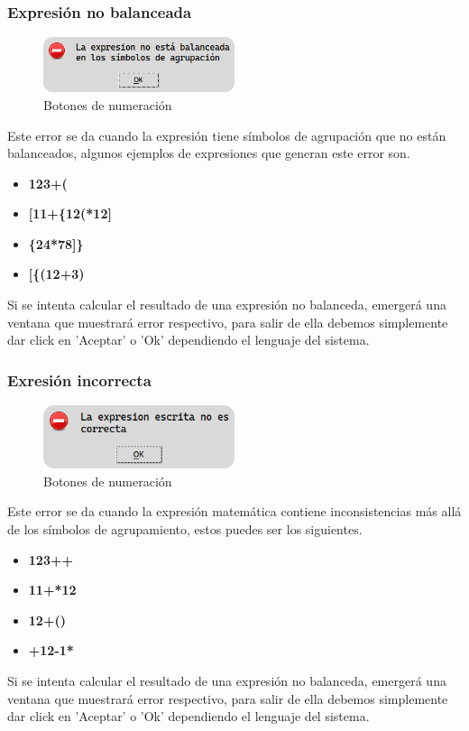 \documentclass[a4paper,12pt]{article}
\begin{document}
\subsubsection{Expresión no balanceada}
\begin{figure}[h!]
    \centering
    \includegraphics[width=0.5\textwidth]{../img/error2.png}
    \caption{Botones de numeración}
    \label{fig: no balanceada}
\end{figure}
Este error se da cuando la expresión tiene símbolos de agrupación que no están balanceados, algunos ejemplos de expresiones que generan este error son.
\begin{itemize}
    \item \textbf{123+(} 
    \item \textbf{ [11+\{12(*12] }
    \item \textbf{\{24*78]\}}
    \item \textbf{ [\{(12+3) }
\end{itemize}
Si se intenta calcular el resultado de una expresión no balanceda, emergerá una ventana que muestrará error respectivo, para salir de ella debemos simplemente dar click en 'Aceptar' o 'Ok' dependiendo el lenguaje del sistema.

\subsubsection{Exresión incorrecta}
\begin{figure}[h!]
    \centering
    \includegraphics[width=0.5\textwidth]{../img/error1.png}
    \caption{Botones de numeración}
    \label{fig: inconsistente}
\end{figure}
Este error se da cuando la expresión matemática contiene inconsistencias más allá de los símbolos de agrupamiento, estos puedes ser los siguientes.
\begin{itemize}
    \item \textbf{123++} 
    \item \textbf{ 11+*12 }
    \item \textbf{12+()}
    \item \textbf{ +12-1* }
\end{itemize}
Si se intenta calcular el resultado de una expresión no balanceda, emergerá una ventana que muestrará error respectivo, para salir de ella debemos simplemente dar click en 'Aceptar' o 'Ok' dependiendo el lenguaje del sistema.
\end{document}
